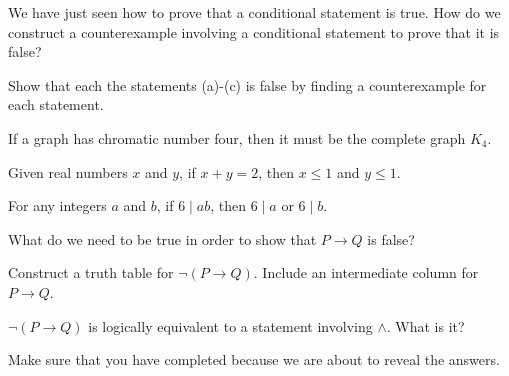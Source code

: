 We have just seen how to prove that a conditional statement is true.  How do we construct a counterexample involving a conditional statement to prove that it is false?

\begin{act}
\label{act_cex_conditionals}
    Show that each the statements (a)-(c) is false by finding a counterexample for each statement.
        \begin{actpart}                   
            \item \label{part_chromatic4_notK4} If a graph has chromatic number four, then it must be the complete graph $K_4$.
            \item \label{part_cex_cond_xplusy} Given real numbers $x$ and $y$, if $x + y = 2$, then $x \le 1$ and $y \le 1$.  
            \item \label{part_cex_cond_abmult6} For any integers $a$ and $b$, if $6 \mid ab$, then $6 \mid a$ or $6 \mid b$.
            \item What do we need to be true in order to show that $P \to Q$ is false?
            \item Construct a truth table for $\neg (P \to Q)$.  Include an intermediate column for $P \to Q$.
            \item $\neg (P \to Q)$ is logically equivalent to a statement involving $\land$.  What is it?
        \end{actpart}  
\end{act}

Make sure that you have completed  because we are about to reveal the answers.

